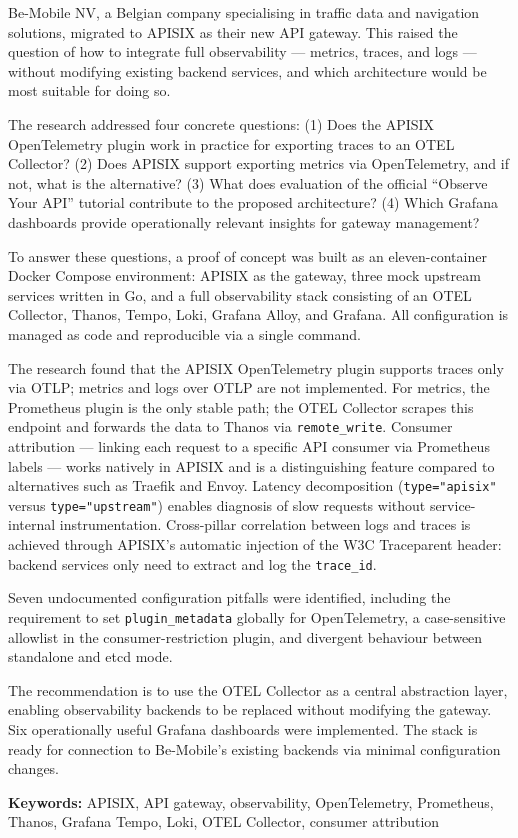 Be-Mobile NV, a Belgian company specialising in traffic data and navigation solutions, migrated to APISIX as their new API gateway. This raised the question of how to integrate full observability --- metrics, traces, and logs --- without modifying existing backend services, and which architecture would be most suitable for doing so.

The research addressed four concrete questions: (1) Does the APISIX OpenTelemetry plugin work in practice for exporting traces to an OTEL Collector? (2) Does APISIX support exporting metrics via OpenTelemetry, and if not, what is the alternative? (3) What does evaluation of the official ``Observe Your API'' tutorial contribute to the proposed architecture? (4) Which Grafana dashboards provide operationally relevant insights for gateway management?

To answer these questions, a proof of concept was built as an eleven-container Docker Compose environment: APISIX as the gateway, three mock upstream services written in Go, and a full observability stack consisting of an OTEL Collector, Thanos, Tempo, Loki, Grafana Alloy, and Grafana. All configuration is managed as code and reproducible via a single command.

The research found that the APISIX OpenTelemetry plugin supports traces only via OTLP; metrics and logs over OTLP are not implemented. For metrics, the Prometheus plugin is the only stable path; the OTEL Collector scrapes this endpoint and forwards the data to Thanos via \texttt{remote\_write}. Consumer attribution --- linking each request to a specific API consumer via Prometheus labels --- works natively in APISIX and is a distinguishing feature compared to alternatives such as Traefik and Envoy. Latency decomposition (\texttt{type="apisix"} versus \texttt{type="upstream"}) enables diagnosis of slow requests without service-internal instrumentation. Cross-pillar correlation between logs and traces is achieved through APISIX's automatic injection of the W3C Traceparent header: backend services only need to extract and log the \texttt{trace\_id}.

Seven undocumented configuration pitfalls were identified, including the requirement to set \texttt{plugin\_metadata} globally for OpenTelemetry, a case-sensitive allowlist in the consumer-restriction plugin, and divergent behaviour between standalone and etcd mode.

The recommendation is to use the OTEL Collector as a central abstraction layer, enabling observability backends to be replaced without modifying the gateway. Six operationally useful Grafana dashboards were implemented. The stack is ready for connection to Be-Mobile's existing backends via minimal configuration changes.

\bigskip
\noindent\textbf{Keywords:} APISIX, API gateway, observability, OpenTelemetry, Prometheus, Thanos, Grafana Tempo, Loki, OTEL Collector, consumer attribution
